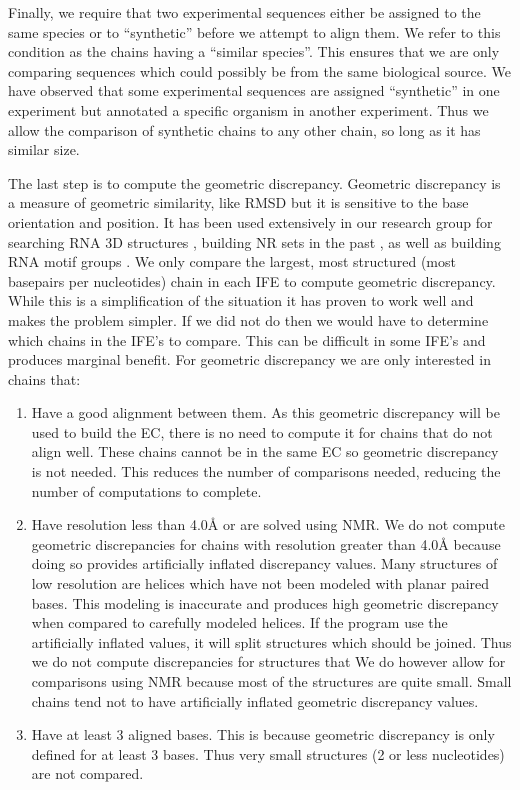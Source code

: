 Finally, we require that two experimental sequences either be assigned to the
same species or to ``synthetic'' before we attempt to align them. We refer to
this condition as the chains having a ``similar species''. This ensures that we
are only comparing sequences which could possibly be from the same biological
source. We have observed that some experimental sequences are assigned
``synthetic'' in one experiment but annotated a specific organism in another
experiment. Thus we allow the comparison of synthetic chains to any other chain,
so long as it has similar size. 

The last step is to compute the geometric discrepancy. Geometric discrepancy is
a measure of geometric similarity, like RMSD but it is sensitive to the base
orientation and position. It has been used extensively in our research group for
searching RNA 3D structures \cite{Sarver2008a}, building NR sets in the past
\cite{Leontis2012b}, as well as building RNA motif groups \cite{Petrov2013}. We
only compare the largest, most structured (most basepairs per nucleotides) chain
in each IFE to compute geometric discrepancy. While this is a simplification of
the situation it has proven to work well and makes the problem simpler. If we
did not do then we would have to determine which chains in the IFE's to compare.
This can be difficult in some IFE's and produces marginal benefit. For geometric
discrepancy we are only interested in chains that:

\begin{enumerate}
  \item Have a good alignment between them. As this geometric discrepancy will
    be used to build the EC, there is no need to compute it for chains that do not
    align well. These chains cannot be in the same EC so geometric
    discrepancy is not needed. This reduces the number of comparisons needed,
    reducing the number of computations to complete.

  \item Have resolution less than 4.0{\AA} or are solved using NMR. We do not
    compute geometric discrepancies for chains with resolution greater than
    4.0{\AA} because doing so provides artificially inflated discrepancy values.
    Many structures of low resolution are helices which have not been modeled
    with planar paired bases. This modeling is inaccurate and produces high
    geometric discrepancy when compared to carefully modeled helices. If the
    program use the artificially inflated values, it will split structures which
    should be joined. Thus we do not compute discrepancies for structures that
    We do however allow for comparisons using NMR because most of the structures
    are quite small. Small chains tend not to have artificially inflated geometric
    discrepancy values.

  \item Have at least 3 aligned bases. This is because geometric discrepancy is only
    defined for at least 3 bases. Thus very small structures (2 or less
    nucleotides) are not compared.
\end{enumerate}


